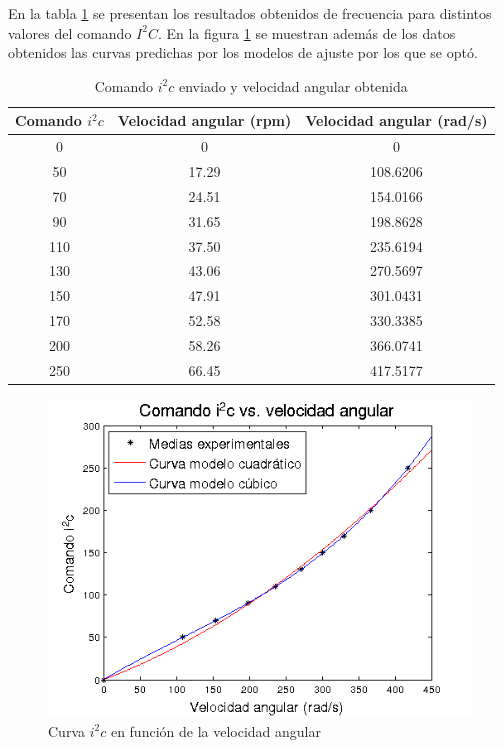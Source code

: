 \documentclass[main]{subfiles}
\begin{document}
En la tabla \ref{tab:iw} se presentan los resultados obtenidos de frecuencia para distintos valores del comando $I^2C$. En la figura \ref{fig:iwi} se muestran adem\'as de los datos obtenidos las curvas predichas por los modelos de ajuste por los que se opt\'o.
\begin{table}[H]
\centering
\begin{tabular}{|c|c|c|} 
	\hline
	\cellcolor[gray]{0.8} \textbf{Comando $i^2c$} & 
	\cellcolor[gray]{0.8} \textbf{Velocidad angular (rpm)} &
	\cellcolor[gray]{0.8} \textbf{Velocidad angular (rad/s)} \\ \hline \hline
0 & 0 & 0\\ \hline 
50 & 17.29 & 108.6206 \\ \hline 
70 & 24.51 & 154.0166 \\ \hline 
90 & 31.65 & 198.8628 \\ \hline 
110 & 37.50 & 235.6194 \\ \hline 
130 & 43.06 & 270.5697 \\ \hline 
150 & 47.91 & 301.0431 \\ \hline 
170 & 52.58 & 330.3385 \\ \hline 
200 & 58.26 & 366.0741 \\ \hline 
250 & 66.45 & 417.5177 \\ \hline 
\end{tabular}
\caption{Comando $i^2c$ enviado y velocidad angular obtenida}
\label{tab:iw}
\end{table}



\begin{figure} [h!]
\centering  
\includegraphics[width=.8\textwidth]{./pics_motores/wi.png} 
\caption{Curva $i^2c$ en funci\'on de la velocidad angular}
\label{fig:iwi}
\end{figure}
\end{document}
